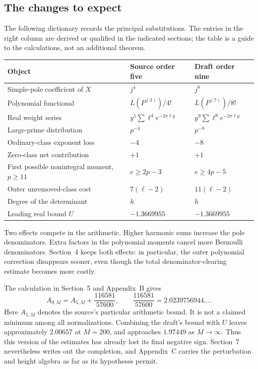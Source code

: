 \subsection{The changes to expect}

The following dictionary records the principal substitutions. The
entries in the right column are derived or qualified in the indicated
sections; the table is a guide to the calculations, not an additional
theorem.
\begin{center}
\small
\begin{tabular}{@{}>{\raggedright\arraybackslash}p{}>{\raggedright\arraybackslash}p{}>{\raggedright\arraybackslash}p{}@{}}
\toprule
Object & Source order five & Draft order nine\\
\midrule
Simple-pole coefficient of $X$ & $j^4$ & $j^8$\\
Polynomial functional & $L(P^{(3)})/4!$ & $L(P^{(7)})/8!$\\
Real weight series & $y^5\sum \ell^4e^{-2\pi\ell y}$ & $y^9\sum \ell^8e^{-2\pi\ell y}$\\
Large-prime distribution & $p^{-4}$ & $p^{-8}$\\
Ordinary-class exponent loss & $-4$ & $-8$\\
Zero-class net contribution & $+1$ & $+1$\\
First possible nonintegral moment, $p\geq11$ & $e\geq2p-3$ & $e\geq4p-5$\\
Outer unremoved-class cost & $7(\ell-2)$ & $11(\ell-2)$\\
Degree of the determinant & $h$ & $h$\\
Leading real bound $U$ & $-1.3669955$ & $-1.3669955$\\
\bottomrule
\end{tabular}
\end{center}

Two effects compete in the arithmetic. Higher harmonic sums increase
the pole denominators. Extra factors in the polynomial moments cancel
more Bernoulli denominators. Section~4 keeps both effects: in particular,
the outer polynomial correction disappears sooner, even though the
total denominator-clearing estimate becomes more costly.

The calculation in Section~5 and Appendix~B gives
\begin{equation}
 A_{9,M}=A_{5,M}+\frac{116581}{57600},\qquad
 \frac{116581}{57600}=2.0239756944\ldots .
 \label{s1-cost-shift}
\end{equation}
Here $A_{5,M}$ denotes the source's particular arithmetic bound. It is
not a claimed minimum among all normalizations. Combining the draft's
bound with $U$ leaves approximately $2.00657$ at $M=200$, and approaches
$1.97449$ as $M\to\infty$. Thus this version of the estimates has already
lost its final negative sign. Section~7 nevertheless writes out the
completion, and Appendix~C carries the perturbation and height algebra
as far as its hypotheses permit.

